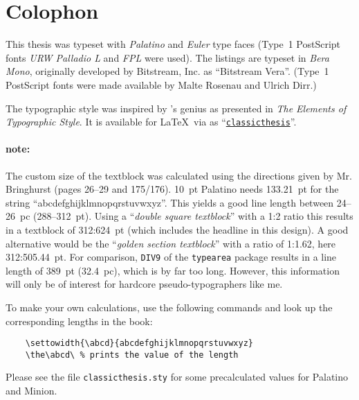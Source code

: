 \pagestyle{empty}

\hfill

\vfill


\section*{Colophon}
This thesis was typeset with %
\emph{Palatino}
and \emph{Euler} type faces (Type~1 PostScript fonts \emph{URW
Palladio L}
and \emph{FPL} were used). The listings are typeset in \emph{Bera
Mono}, originally developed by Bitstream, Inc. as ``Bitstream Vera''.
(Type~1 PostScript fonts were made available by Malte Rosenau and
Ulrich Dirr.)

The typographic style was inspired by 's genius as
presented in \emph{The Elements of Typographic Style}.%
It is available for \LaTeX\ via  as 
``\href{http://www.ctan.org/tex-archive/macros/latex/contrib/classicthesis/}%
{\texttt{classicthesis}}''.

\paragraph{note:} The custom size of the textblock was calculated
using the directions given by Mr. Bringhurst (pages 26--29 and
175/176). 10~pt Palatino needs  133.21~pt for the string
``abcdefghijklmnopqrstuvwxyz''. This yields a good line length between
24--26~pc (288--312~pt). Using a ``\emph{double square textblock}''
with a 1:2 ratio this results in a textblock of 312:624~pt (which
includes the headline in this design). A good alternative would be the
``\emph{golden section textblock}'' with a ratio of 1:1.62, here
312:505.44~pt. For comparison, \texttt{DIV9} of the \texttt{typearea}
package results in a line length of 389~pt (32.4~pc), which is by far
too long. However, this information will only be of interest for
hardcore pseudo-typographers like me.%

To make your own calculations, use the following commands and look up
the corresponding lengths in the book:
\begin{verbatim}
    \settowidth{\abcd}{abcdefghijklmnopqrstuvwxyz}
    \the\abcd\ % prints the value of the length
\end{verbatim}
Please see the file \texttt{classicthesis.sty} for some precalculated 
values for Palatino and Minion.

    \settowidth{\abcd}{abcdefghijklmnopqrstuvwxyz}
    \the\abcd\ %


\bigskip

\noindent\finalVersionString



